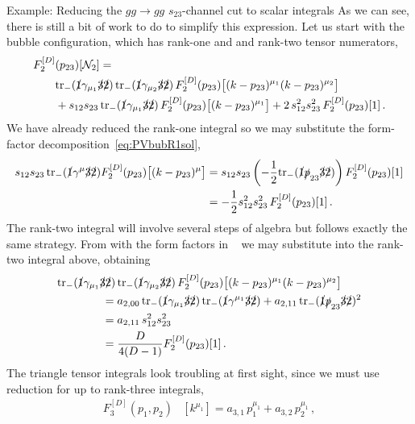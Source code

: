 \begin{example}{Example: Reducing the $gg\to gg$ $s_{23}$-channel cut to scalar integrals}
As we can see, there is still a bit of work to do to simplify this expression. Let us start with the bubble configuration, which has rank-one and and rank-two tensor numerators,
\begin{align} \begin{aligned}
  F_2^{[D]}&(p_{23})[\mathcal{N}_2] = \\
   & {\rm tr}_-( \slashed{1} \gamma_{\mu_1} \slashed{3} \slashed{2} ) \, {\rm tr}_-( \slashed{1} \gamma_{\mu_2} \slashed{3} \slashed{2} ) \, F_2^{[D]}(p_{23})\bigl[(k-p_{23})^{\mu_1}(k-p_{23})^{\mu_2}\bigr] \\
  & + s_{12} s_{23} \, {\rm tr}_-( \slashed{1} \gamma_{\mu_1} \slashed{3} \slashed{2} ) \, F_2^{[D]}(p_{23})\bigl[(k-p_{23})^{\mu_1}\bigr] + 2 \, s_{12}^2s_{23}^2 \, F_2^{[D]}(p_{23})[1] \,.
  \end{aligned}
  \label{eq:c23bubred}
\end{align}
We have already reduced the rank-one integral so we may substitute the form-factor decomposition~\eqref{eq:PVbubR1sol},
\begin{align} \begin{aligned}
  s_{12} s_{23} \, {\rm tr}_-( \slashed{1} \gamma^{\mu} \slashed{3} \slashed{2} )
  F_2^{[D]}(p_{23})\bigl[(k-p_{23})^{\mu}\bigr] & = s_{12} s_{23} \left( -\frac{1}{2}{\rm tr}_-( \slashed{1} \slashed{p}_{23} \slashed{3} \slashed{2} ) \right) F^{[D]}_2(p_{23})[1] \\
  & = -\frac{1}{2} s_{12}^2 s_{23}^2 \, F^{[D]}_2(p_{23})[1] \,.
  \end{aligned}
\end{align}
The rank-two integral will involve several steps of algebra but follows exactly
the same strategy. From  with the form factors in ~ we may substitute into the
rank-two integral above, obtaining
\begin{align}
  &{\rm tr}_-( \slashed{1} \gamma_{\mu_1} \slashed{3} \slashed{2} ) \, {\rm tr}_-( \slashed{1} \gamma_{\mu_2} \slashed{3} \slashed{2} ) \, F_2^{[D]}(p_{23})\bigl[(k-p_{23})^{\mu_1}(k-p_{23})^{\mu_2} \bigr] \nonumber\\
  & \qquad \qquad = a_{2,00} \, {\rm tr}_-( \slashed{1} \gamma_{\mu_1} \slashed{3} \slashed{2} ) \, {\rm tr}_-( \slashed{1} \gamma^{\mu_1} \slashed{3} \slashed{2} ) + a_{2,11} \, {\rm tr}_-( \slashed{1} \slashed{p}_{23} \slashed{3} \slashed{2} ){}^2 \nonumber\\
  & \qquad \qquad = a_{2,11} \, s_{12}^2 s_{23}^2 \nonumber\\
  & \qquad \qquad = \frac{D}{4 (D-1)} F^{[D]}_2(p_{23})[1] \,.
\end{align}
The triangle tensor integrals look troubling at first sight, since we must use reduction for up to rank-three integrals,
\begin{align}
  F^{[D]}_{3}(p_1,p_2)&[k^{\mu_1}] =  a_{3,1} \, p_1^{\mu_1} + a_{3,2} \, p_2^{\mu_1} \,, \label{eq:PVtriR1dec}\\

\end{align}
\end{example}
